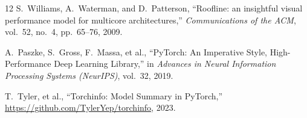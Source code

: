 \documentclass[11pt,a4paper]{article}
\begin{document}
\begin{thebibliography}{12}
S.~Williams, A.~Waterman, and D.~Patterson,
\newblock ``Roofline: an insightful visual performance model for multicore architectures,''
\newblock \emph{Communications of the ACM}, vol.~52, no.~4, pp.~65--76, 2009.

A.~Paszke, S.~Gross, F.~Massa, et al.,
\newblock ``PyTorch: An Imperative Style, High-Performance Deep Learning Library,''
\newblock in \emph{Advances in Neural Information Processing Systems (NeurIPS)}, vol.~32, 2019.

T.~Tyler, et al.,
\newblock ``Torchinfo: Model Summary in PyTorch,''
\newblock \url{https://github.com/TylerYep/torchinfo}, 2023.

\end{thebibliography}
\end{document}
